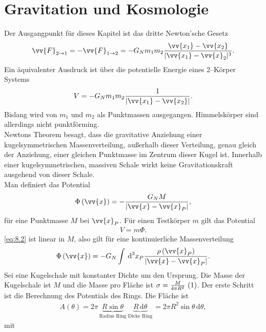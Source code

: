 \documentclass[a4paper,12pt]{article}
\newcommand{\td}{\,\text{d}}
\newcommand\inlineeqno{\stepcounter{equation}\ {(\theequation)}}
\numberwithin{equation}{section}
\begin{document}
\newpage
\section{Gravitation und Kosmologie}
Der Ausgangpunkt für dieses Kapitel ist das dritte Newton'sche Gesetz
\begin{align*} 
        \vv{F}_{2\rightarrow 1}=-\vv{F}_{1\rightarrow 2}=-G_Nm_1m_2\dfrac{\vv{x_1}-\vv{x_2}}{|\vv{x_1}-\vv{x}_2|^3}
.\end{align*} 
Ein äquivalenter Ausdruck ist über die potentielle Energie eines 2--Körper Systems
\begin{align} 
        V=-G_Nm_1m_2\dfrac{1}{|\vv{x_1}-\vv{x_2}|}\label{eq:8.1}
.\end{align} 
Bislang wird von $m_1$ und $m_2$ als Punktmassen ausgegangen. Himmelskörper sind allerdings nicht punktförming.\\\indent
Newtons Theorem besagt, dass die gravitative Anziehung einer kugelsymmetrischen Massenverteilung, außerhalb dieser Verteilung, genau gleich der Anziehung, einer gleichen Punktmasse im Zentrum dieser Kugel ist. Innerhalb einer kugelsymmetrischen, massiven Schale wirkt keine Gravitationskraft ausgehend von dieser Schale.\\\indent
Man definiert das Potential
\begin{align} 
        \Phi \left(\vv{x}\right)=-\dfrac{G_NM}{|\vv{x}-\vv{x}_P|}\label{eq:8.2}
,\end{align} 
für eine Punktmasse $M$ bei $\vv{x}_P$. Für einen Testkörper $m$ gilt das Potential
\begin{align} 
        V=m\Phi \label{eq:8.3}
.\end{align} 
\eqref{eq:8.2} ist linear in $M$, also gilt für eine kontinuierliche Massenverteilung
\begin{align} 
        \Phi \left(\vv{x}\right)=-G_N\int_{}^{}\td ^3x_P\dfrac{\rho \left(\vv{x}_P\right)}{|\vv{x}-\vv{x}_P|}\label{eq:8.4}
.\end{align} 
Sei eine Kugelschale mit konstanter Dichte um den Ursprung. Die Masse der Kugelschale ist $M$ und die Masse pro Fläche ist $\sigma =\tfrac{M}{4\pi R^2}\inlineeqno\label{eq:8.5}$. Der erste Schritt ist die Berechnung des Potentials des Rings. Die Fläche ist
\begin{align} 
        A\left(\theta \right)=2\pi \underbrace{R\sin \theta }_{\,\text{Radius Ring}\,}\underbrace{R\td \theta }_{\,\text{Dicke Ring}\,}=2\pi R^2\sin \theta \td \theta \label{eq:8.6}
,\end{align} 
mit 
\end{document}
